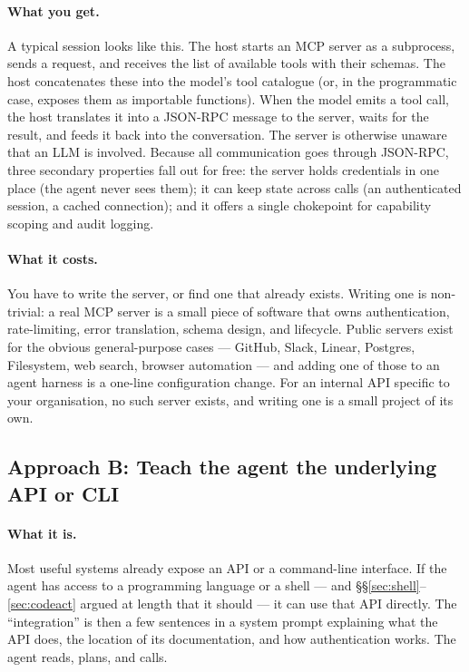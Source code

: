\paragraph{What you get.}
A typical session looks like this. The host starts an MCP server
as a subprocess, sends a  request, and receives
the list of available tools with their schemas. The host
concatenates these into the model's tool catalogue (or, in the
programmatic case, exposes them as importable functions). When the
model emits a tool call, the host translates it into a
 JSON-RPC message to the server, waits for the
result, and feeds it back into the conversation. The server is
otherwise unaware that an LLM is involved. Because all
communication goes through JSON-RPC, three secondary properties
fall out for free: the server holds credentials in one place
(the agent never sees them); it can keep state across calls (an
authenticated session, a cached connection); and it offers a
single chokepoint for capability scoping and audit logging.

\paragraph{What it costs.}
You have to write the server, or find one that already exists.
Writing one is non-trivial: a real MCP server is a small piece of
software that owns authentication, rate-limiting, error
translation, schema design, and lifecycle. Public servers exist
for the obvious general-purpose cases --- GitHub, Slack, Linear,
Postgres, Filesystem, web search, browser automation --- and
adding one of those to an agent harness is a one-line
configuration change. For an internal API specific to your
organisation, no such server exists, and writing one is a small
project of its own.

\subsection{Approach B: Teach the agent the underlying API or CLI}
\label{sec:mcp-api-approach}

\paragraph{What it is.}
Most useful systems already expose an API or a command-line
interface. If the agent has access to a programming language or
a shell --- and \S\S\ref{sec:shell}--\ref{sec:codeact} argued at
length that it should --- it can use that API directly. The
``integration'' is then a few sentences in a system prompt
explaining what the API does, the location of its documentation,
and how authentication works. The agent reads, plans, and calls.

